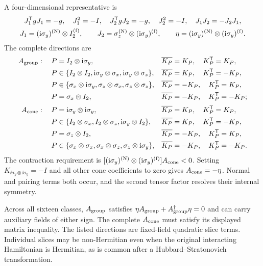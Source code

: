 A four-dimensional representative is
\begin{equation}
\begin{gathered}
J_1^{\mathsf{T}} gJ_1=-g,\quad J_1^2=-I,\quad
J_2^{\mathsf{T}} gJ_2=-g,\quad J_2^2=-I,\quad
J_1J_2=-J_2J_1,\\
J_1=(\mathrm{i}\sigma_y)^{({\rm N})}\otimes I_2^{({\rm f})},\qquad
J_2=\sigma_z^{({\rm N})}\otimes(\mathrm{i}\sigma_y)^{({\rm f})},\qquad
\eta=(\mathrm{i}\sigma_y)^{({\rm N})}\otimes(\mathrm{i}\sigma_y)^{({\rm f})}.
\end{gathered}
\end{equation}
The complete directions are
\begin{align*}
A_{\rm group}:\quad
P&=I_2\otimes\mathrm{i}\sigma_y,&&\overline{K_P}=K_P,\quad K_P^{\mathsf{T}}=K_P,\\
P&\in\{I_2\otimes I_2,\mathrm{i}\sigma_y\otimes\sigma_x,
\mathrm{i}\sigma_y\otimes\sigma_z\},&&\overline{K_P}=K_P,\quad K_P^{\mathsf{T}}=-K_P,\\
P&\in\{\sigma_x\otimes\mathrm{i}\sigma_y,\sigma_z\otimes\sigma_x,
\sigma_z\otimes\sigma_z\},&&\overline{K_P}=-K_P,\quad K_P^{\mathsf{T}}=K_P,\\
P&=\sigma_x\otimes I_2,&&\overline{K_P}=-K_P,\quad K_P^{\mathsf{T}}=-K_P;\\[2pt]
A_{\rm cone}:\quad
P&=\mathrm{i}\sigma_y\otimes\mathrm{i}\sigma_y,&&\overline{K_P}=K_P,\quad K_P^{\mathsf{T}}=K_P,\\
P&\in\{I_2\otimes\sigma_x,I_2\otimes\sigma_z,
\mathrm{i}\sigma_y\otimes I_2\},&&\overline{K_P}=K_P,\quad K_P^{\mathsf{T}}=-K_P,\\
P&=\sigma_z\otimes I_2,&&\overline{K_P}=-K_P,\quad K_P^{\mathsf{T}}=K_P,\\
P&\in\{\sigma_x\otimes\sigma_x,\sigma_x\otimes\sigma_z,
\sigma_z\otimes\mathrm{i}\sigma_y\},&&\overline{K_P}=-K_P,\quad K_P^{\mathsf{T}}=-K_P.
\end{align*}
The contraction requirement is
\([(\mathrm{i}\sigma_y)^{({\rm N})}\otimes(\mathrm{i}\sigma_y)^{({\rm f})}]A_{\rm cone}<0\).  Setting
\(K_{\ii\sigma_y\otimes\ii\sigma_y}=-I\) and all other cone coefficients to zero gives \(A_{\rm cone}=-\eta\).  Normal and pairing terms both occur, and the second tensor factor resolves their internal symmetry.

Across all sixteen classes, \(A_{\rm group}\) satisfies \(\eta A_{\rm group}+A_{\rm group}^\dagger\eta=0\) and can carry auxiliary fields of either sign.  The complete \(A_{\rm cone}\) must satisfy its displayed matrix inequality.  The listed directions are fixed-field quadratic slice terms.  Individual slices may be non-Hermitian even when the original interacting Hamiltonian is Hermitian, as is common after a Hubbard--Stratonovich transformation.
